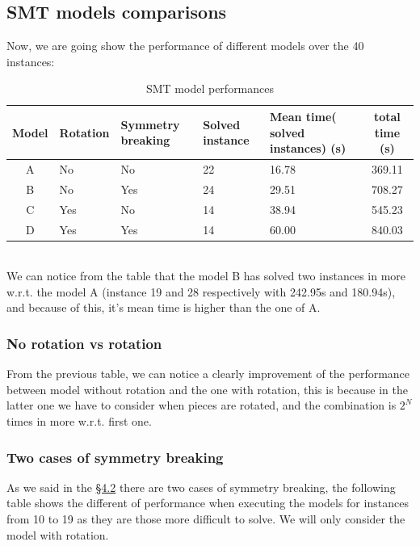 \subsection{SMT models comparisons}
Now, we are going show the performance of different models over the 40 instances: \\
\begin{table}[!h]
    \begin{tabular}{|c| p{2cm} | p{2 cm} | p{1.5cm} | p{3.5cm} | c |}\hline
        Model &Rotation& Symmetry breaking& Solved instance & Mean time( solved instances) (s) & total time (s) \\\hline
           A &No  & No  & 22  & 16.78 & 369.11 \\ \hline
           B &No  & Yes & 24  & 29.51 & 708.27 \\ \hline
           C &Yes & No  & 14  & 38.94 & 545.23 \\ \hline
           D &Yes & Yes & 14  & 60.00 & 840.03 \\ \hline
    \end{tabular}
    \caption{SMT model performances}
    \label{tab:smt-performance}
\end{table}
\\
We can notice from the table that the model B has solved two instances in more w.r.t. the model A (instance 19 and 28 respectively with 242.95s and 180.94s), and because of this, it's mean time is higher than the one of A. 
\subsubsection{No rotation vs rotation}

From the previous table, we can notice a clearly improvement of the performance between model without rotation and the one with rotation, this is because in the latter one we have to consider when pieces are rotated, and the combination is $2^N$ times in more w.r.t. first one. 
\subsubsection{Two cases of symmetry breaking}

As we said in the \hyperref[subsec:smt-symmetry-breaking]{\S 4.2} there are two cases of symmetry breaking, the following table shows the different of performance when executing the models for instances from 10 to 19 as they are those more difficult to solve. We will only consider the model with rotation.

